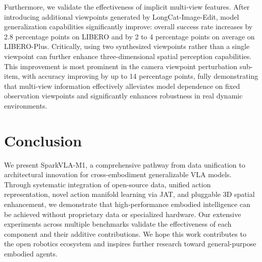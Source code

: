 \documentclass[11pt,a4paper]{article}
\begin{document}
Furthermore, we validate the effectiveness of implicit multi-view features. After introducing additional viewpoints generated by LongCat-Image-Edit, model generalization capabilities significantly improve: overall success rate increases by 2.8 percentage points on LIBERO and by 2 to 4 percentage points on average on LIBERO-Plus. Critically, using two synthesized viewpoints rather than a single viewpoint can further enhance three-dimensional spatial perception capabilities. This improvement is most prominent in the camera viewpoint perturbation sub-item, with accuracy improving by up to 14 percentage points, fully demonstrating that multi-view information effectively alleviates model dependence on fixed observation viewpoints and significantly enhances robustness in real dynamic environments.

\section{Conclusion}

We present SparkVLA-M1, a comprehensive pathway from data unification to architectural innovation for cross-embodiment generalizable VLA models. Through systematic integration of open-source data, unified action representation, novel action manifold learning via JAT, and pluggable 3D spatial enhancement, we demonstrate that high-performance embodied intelligence can be achieved without proprietary data or specialized hardware. Our extensive experiments across multiple benchmarks validate the effectiveness of each component and their additive contributions. We hope this work contributes to the open robotics ecosystem and inspires further research toward general-purpose embodied agents.
\end{document}
